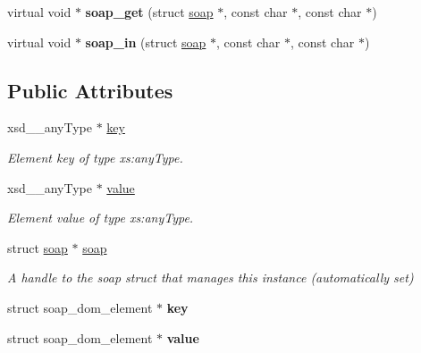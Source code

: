\begin{DoxyCompactItemize}
\item 
\hypertarget{classns2____mapItem_aaf56dd6dd8627ae48395ba14a17970ff}{
virtual void $\ast$ {\bfseries soap\_\-get} (struct \hyperlink{classns2____mapItem_a1d78106dfdd587fa9e2dbfecbd5bc790}{soap} $\ast$, const char $\ast$, const char $\ast$)}
\label{classns2____mapItem_aaf56dd6dd8627ae48395ba14a17970ff}

\item 
\hypertarget{classns2____mapItem_a50a1bce94aa8d1e754f4d2da9330e51c}{
virtual void $\ast$ {\bfseries soap\_\-in} (struct \hyperlink{classns2____mapItem_a1d78106dfdd587fa9e2dbfecbd5bc790}{soap} $\ast$, const char $\ast$, const char $\ast$)}
\label{classns2____mapItem_a50a1bce94aa8d1e754f4d2da9330e51c}

\end{DoxyCompactItemize}
\subsection*{Public Attributes}
\begin{DoxyCompactItemize}
\item 
xsd\_\-\_\-anyType $\ast$ \hyperlink{classns2____mapItem_a3307ddb876ac652c96ddd8b9be153672}{key}
\begin{DoxyCompactList}\small\item\em Element key of type xs:anyType. \end{DoxyCompactList}\item 
xsd\_\-\_\-anyType $\ast$ \hyperlink{classns2____mapItem_a293e189c48932a5bec66e397e0c813de}{value}
\begin{DoxyCompactList}\small\item\em Element value of type xs:anyType. \end{DoxyCompactList}\item 
\hypertarget{classns2____mapItem_a1d78106dfdd587fa9e2dbfecbd5bc790}{
struct \hyperlink{classns2____mapItem_a1d78106dfdd587fa9e2dbfecbd5bc790}{soap} $\ast$ \hyperlink{classns2____mapItem_a1d78106dfdd587fa9e2dbfecbd5bc790}{soap}}
\label{classns2____mapItem_a1d78106dfdd587fa9e2dbfecbd5bc790}

\begin{DoxyCompactList}\small\item\em A handle to the soap struct that manages this instance (automatically set) \end{DoxyCompactList}\item 
\hypertarget{classns2____mapItem_a81524a2efaf116ec7c4d1b5ff63effa5}{
struct soap\_\-dom\_\-element $\ast$ {\bfseries key}}
\label{classns2____mapItem_a81524a2efaf116ec7c4d1b5ff63effa5}

\item 
\hypertarget{classns2____mapItem_a9cd5c5b7086f33c0d027513cd331b8f4}{
struct soap\_\-dom\_\-element $\ast$ {\bfseries value}}
\label{classns2____mapItem_a9cd5c5b7086f33c0d027513cd331b8f4}

\end{DoxyCompactItemize}


